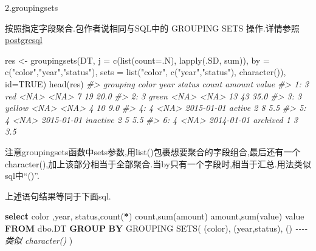 \documentclass[
]{book}
\newenvironment{Shaded}{\begin{snugshade}}{\end{snugshade}}
\newcommand{\AttributeTok}[1]{\textcolor[rgb]{0.77,0.63,0.00}{#1}}
\newcommand{\CommentTok}[1]{\textcolor[rgb]{0.56,0.35,0.01}{\textit{#1}}}
\newcommand{\ConstantTok}[1]{\textcolor[rgb]{0.00,0.00,0.00}{#1}}
\newcommand{\DataTypeTok}[1]{\textcolor[rgb]{0.13,0.29,0.53}{#1}}
\newcommand{\FunctionTok}[1]{\textcolor[rgb]{0.00,0.00,0.00}{#1}}
\newcommand{\KeywordTok}[1]{\textcolor[rgb]{0.13,0.29,0.53}{\textbf{#1}}}
\newcommand{\NormalTok}[1]{#1}
\newcommand{\OperatorTok}[1]{\textcolor[rgb]{0.81,0.36,0.00}{\textbf{#1}}}
\newcommand{\OtherTok}[1]{\textcolor[rgb]{0.56,0.35,0.01}{#1}}
\newcommand{\StringTok}[1]{\textcolor[rgb]{0.31,0.60,0.02}{#1}}
\begin{document}
2.groupingsets

按照指定字段聚合.包作者说相同与SQL中的 GROUPING SETS 操作.详情参照\href{http://www.postgresql.org/docs/9.5/static/queries-table-expressions.html\#QUERIES-GROUPING-SETS}{postgresql}

\begin{Shaded}
\begin{Highlighting}[]
\NormalTok{res }\OtherTok{\textless{}{-}} \FunctionTok{groupingsets}\NormalTok{(DT, }\AttributeTok{j =} \FunctionTok{c}\NormalTok{(}\FunctionTok{list}\NormalTok{(}\AttributeTok{count=}\NormalTok{.N), }\FunctionTok{lapply}\NormalTok{(.SD, sum)), }\AttributeTok{by =} \FunctionTok{c}\NormalTok{(}\StringTok{"color"}\NormalTok{,}\StringTok{"year"}\NormalTok{,}\StringTok{"status"}\NormalTok{),}
             \AttributeTok{sets =} \FunctionTok{list}\NormalTok{(}\StringTok{"color"}\NormalTok{, }\FunctionTok{c}\NormalTok{(}\StringTok{"year"}\NormalTok{,}\StringTok{"status"}\NormalTok{), }\FunctionTok{character}\NormalTok{()), }\AttributeTok{id=}\ConstantTok{TRUE}\NormalTok{)}
\FunctionTok{head}\NormalTok{(res)}
\CommentTok{\#\textgreater{}    grouping  color       year   status count amount value}
\CommentTok{\#\textgreater{} 1:        3    red       \textless{}NA\textgreater{}     \textless{}NA\textgreater{}     7     19  20.0}
\CommentTok{\#\textgreater{} 2:        3  green       \textless{}NA\textgreater{}     \textless{}NA\textgreater{}    13     43  35.0}
\CommentTok{\#\textgreater{} 3:        3 yellow       \textless{}NA\textgreater{}     \textless{}NA\textgreater{}     4     10   9.0}
\CommentTok{\#\textgreater{} 4:        4   \textless{}NA\textgreater{} 2015{-}01{-}01   active     2      8   5.5}
\CommentTok{\#\textgreater{} 5:        4   \textless{}NA\textgreater{} 2015{-}01{-}01 inactive     2      5   5.5}
\CommentTok{\#\textgreater{} 6:        4   \textless{}NA\textgreater{} 2014{-}01{-}01 archived     1      3   3.5}
\end{Highlighting}
\end{Shaded}

注意groupingsets函数中sets参数,用list()包裹想要聚合的字段组合,最后还有一个character(),加上该部分相当于全部聚合.当by只有一个字段时,相当于汇总.用法类似sql中``()''.

上述语句结果等同于下面sql.

\begin{Shaded}
\begin{Highlighting}[]
\KeywordTok{select}\NormalTok{ color ,}\DataTypeTok{year}\NormalTok{, status,}\FunctionTok{count}\NormalTok{(}\OperatorTok{*}\NormalTok{) }\FunctionTok{count}\NormalTok{,}\FunctionTok{sum}\NormalTok{(amount) amount,}\FunctionTok{sum}\NormalTok{(}\FunctionTok{value}\NormalTok{) }\FunctionTok{value} 
\KeywordTok{FROM}\NormalTok{ dbo.DT}
\KeywordTok{GROUP} \KeywordTok{BY}
\FunctionTok{GROUPING}\NormalTok{ SETS(}
\NormalTok{(color),}
\NormalTok{(}\DataTypeTok{year}\NormalTok{,status),}
\NormalTok{() }\CommentTok{{-}{-}{-}{-} 类似 character()}
\NormalTok{)}
\end{Highlighting}
\end{Shaded}
\end{document}
